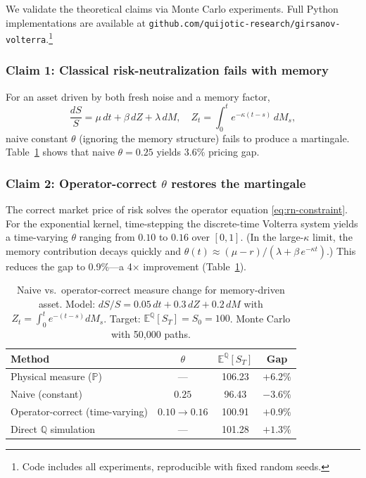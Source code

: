 \documentclass[11pt]{article}
\theoremstyle{plain}
\theoremstyle{definition}
\theoremstyle{remark}
\newcommand{\E}{\mathbb{E}}
\newcommand{\PP}{\mathbb{P}}
\newcommand{\QQ}{\mathbb{Q}}
\begin{document}
We validate the theoretical claims via Monte Carlo experiments. Full Python
implementations are available at \texttt{github.com/quijotic-research/girsanov-volterra}.\footnote{Code includes all experiments, reproducible with fixed random seeds.}

\subsubsection{Claim 1: Classical risk-neutralization fails with memory}

For an asset driven by both fresh noise and a memory factor,
\[
\frac{dS}{S} = \mu\,dt + \beta\,dZ + \lambda\,dM,
\quad Z_t = \int_0^t e^{-\kappa(t-s)}\,dM_s,
\]
naive constant $\theta$ (ignoring the memory structure) fails to produce a
martingale. Table~\ref{tab:naive-vs-operator} shows that naive $\theta = 0.25$
yields 3.6\% pricing gap.

\subsubsection{Claim 2: Operator-correct $\theta$ restores the martingale}

The correct market price of risk solves the operator equation
\eqref{eq:rn-constraint}. For the exponential kernel, time-stepping the
discrete-time Volterra system yields a time-varying $\theta$ ranging from
$0.10$ to $0.16$ over $[0,1]$. (In the large-$\kappa$ limit, the memory
contribution decays quickly and $\theta(t) \approx (\mu - r)/(\lambda + \beta\,e^{-\kappa t})$.)
This reduces the gap to 0.9\%---a
4$\times$ improvement (Table~\ref{tab:naive-vs-operator}).

\begin{table}[h]
\centering
\caption{Naive vs.\ operator-correct measure change for memory-driven asset.
Model: $dS/S = 0.05\,dt + 0.3\,dZ + 0.2\,dM$ with $Z_t = \int_0^t e^{-(t-s)}dM_s$.
Target: $\E^{\QQ}[S_T] = S_0 = 100$. Monte Carlo with 50{,}000 paths.}
\label{tab:naive-vs-operator}
\begin{tabular}{lccc}
\hline
\textbf{Method} & \textbf{$\theta$} & $\E^{\QQ}[S_T]$ & \textbf{Gap} \\
\hline
Physical measure ($\PP$) & --- & 106.23 & +6.2\% \\
Naive (constant) & $0.25$ & 96.43 & $-3.6\%$ \\
Operator-correct (time-varying) & $0.10 \to 0.16$ & 100.91 & $+0.9\%$ \\
Direct $\QQ$ simulation & --- & 101.28 & $+1.3\%$ \\
\hline
\end{tabular}
\end{table}
\end{document}

